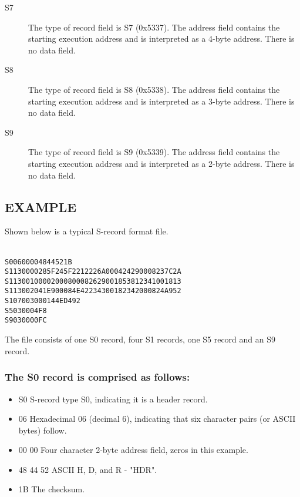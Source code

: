 \begin{description}
            \item[S7]
                The type of record field is S7 (0x5337). The address field contains the starting execution address and is interpreted as a 4-byte address. There is no data field.

            \item[S8]
                The type of record field is S8 (0x5338). The address field contains the starting execution address and is interpreted as a 3-byte address. There is no data field.

            \item[S9]
                The type of record field is S9 (0x5339). The address field contains the starting execution address and is interpreted as a 2-byte address. There is no data field.
        \end{description}

    \subsection{EXAMPLE}
        Shown below is a typical S-record format file.

        {
            \usecodefont
            \verb''\\
            \verb'S00600004844521B'\\
            \verb'S1130000285F245F2212226A000424290008237C2A'\\
            \verb'S11300100002000800082629001853812341001813'\\
            \verb'S113002041E900084E42234300182342000824A952'\\
            \verb'S107003000144ED492'\\
            \verb'S5030004F8'\\
            \verb'S9030000FC'\\
        }

        The file consists of one S0 record, four S1 records, one S5 record and an S9 record.

    \subsubsection{The S0 record is comprised as follows:}
        \begin{itemize}
            \item S0 S-record type S0, indicating it is a header record.
            \item 06 Hexadecimal 06 (decimal 6), indicating that six character pairs (or ASCII bytes) follow.
            \item 00 00 Four character 2-byte address field, zeros in this example.
            \item 48 44 52 ASCII H, D, and R - "HDR".
            \item 1B The checksum.
        \end{itemize}

